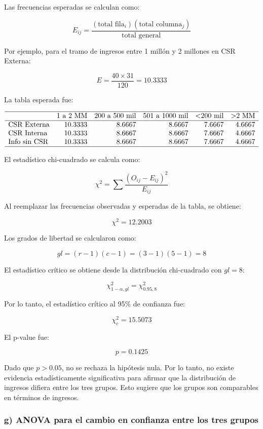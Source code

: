 \documentclass[12pt,letterpaper]{article}
\begin{document}
Las frecuencias esperadas se calculan como:

\[
E_{ij} =
\frac{(\text{total fila}_i)(\text{total columna}_j)}
{\text{total general}}
\]

Por ejemplo, para el tramo de ingresos entre 1 millón y 2 millones en CSR Externa:

\[
E =
\frac{40 \times 31}{120}
= 10.3333
\]

La tabla esperada fue:

\[
\begin{array}{lrrrrr}
\hline
 & \text{1 a 2 MM} & \text{200 a 500 mil} & \text{501 a 1000 mil} & \text{<200 mil} & \text{>2 MM} \\
\hline
\text{CSR Externa} & 10.3333 & 8.6667 & 8.6667 & 7.6667 & 4.6667 \\
\text{CSR Interna} & 10.3333 & 8.6667 & 8.6667 & 7.6667 & 4.6667 \\
\text{Info sin CSR} & 10.3333 & 8.6667 & 8.6667 & 7.6667 & 4.6667 \\
\hline
\end{array}
\]

El estadístico chi-cuadrado se calcula como:

\[
\chi^2 =
\sum \frac{(O_{ij}-E_{ij})^2}{E_{ij}}
\]

Al reemplazar las frecuencias observadas y esperadas de la tabla, se obtiene:

\[
\chi^2 = 12.2003
\]

Los grados de libertad se calcularon como:

\[
gl = (r-1)(c-1) = (3-1)(5-1) = 8
\]

El estadístico crítico se obtiene desde la distribución chi-cuadrado con \(gl = 8\):

\[
\chi^2_{1-\alpha,gl} = \chi^2_{0.95,8}
\]

Por lo tanto, el estadístico crítico al 95\% de confianza fue:

\[
\chi^2_c = 15.5073
\]

El p-value fue:

\[
p = 0.1425
\]

Dado que \(p > 0.05\), no se rechaza la hipótesis nula. Por lo tanto, no existe evidencia estadísticamente significativa para afirmar que la distribución de ingresos difiera entre los tres grupos. Esto sugiere que los grupos son comparables en términos de ingresos.

\subsubsection*{g) ANOVA para el cambio en confianza entre los tres grupos}
\end{document}
